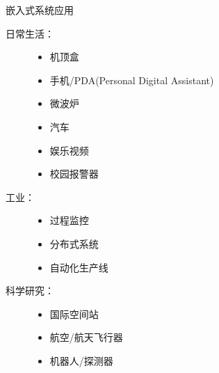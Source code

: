 \begin{frame}{嵌入式系统应用}
\begin{description}
\item [日常生活：]
\begin{itemize}
\item 机顶盒
\item 手机/PDA(Personal Digital Assistant)
\item 微波炉
\item 汽车
\item 娱乐视频
\item 校园报警器
\end{itemize}
\item[工业：]
\begin{itemize}
\item 过程监控
\item 分布式系统
\item 自动化生产线
\end{itemize}
\item[科学研究：]
\begin{itemize}
\item 国际空间站
\item 航空/航天飞行器
\item 机器人/探测器
\end{itemize}
\end{description}
\end{frame}


\begin{frame}{}
\begin{center}\end{center}
\end{frame}
\begin{frame}{}
\begin{center}
\end{center}
\end{frame}
\begin{frame}{}
\begin{center}\end{center}
\end{frame}
\begin{frame}{}
\begin{center}\end{center}
\end{frame}
\begin{frame}{}
\begin{center}\end{center}
\end{frame}
\begin{frame}{}
\begin{center}\end{center}
\end{frame}



